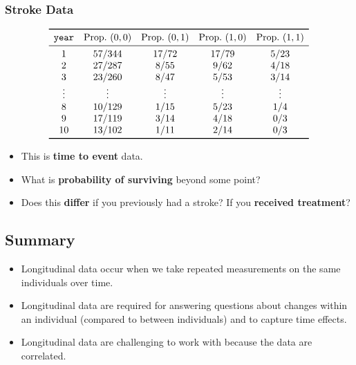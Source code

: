 \subsubsection{Stroke Data}
\[ \begin{array}{ccccc}
        \toprule
        \texttt{year} & \text{Prop.}~(0,0) & \text{Prop.}~(0,1) & \text{Prop.}~(1,0) & \text{Prop.}~(1,1) \\
        \midrule
        1             & 57 / 344           & 17 / 72            & 17 / 79            & 5 / 23             \\
        2             & 27 / 287           & 8 / 55             & 9 / 62             & 4 / 18             \\
        3             & 23 / 260           & 8 / 47             & 5 / 53             & 3 / 14             \\
        \vdots        & \vdots             & \vdots             & \vdots             & \vdots             \\
        8             & 10 / 129           & 1 / 15             & 5 / 23             & 1 / 4              \\
        9             & 17 / 119           & 3 / 14             & 4 / 18             & 0 / 3              \\
        10            & 13 / 102           & 1 / 11             & 2 / 14             & 0 / 3              \\
        \bottomrule
    \end{array} \]
\begin{itemize}
    \item This is \textbf{time to event} data.
    \item What is \textbf{probability of surviving} beyond some point?
    \item Does this \textbf{differ} if you previously had a stroke? If you \textbf{received treatment}?
\end{itemize}
\subsection{Summary}
\begin{itemize}
    \item Longitudinal data occur when we take repeated measurements on the same
          individuals over time.
    \item Longitudinal data are required for answering questions about changes within an
          individual (compared to between individuals) and to capture time effects.
    \item Longitudinal data are challenging to work with because the data are correlated.
\end{itemize}